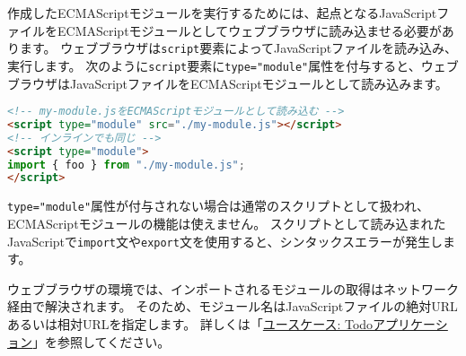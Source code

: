 作成したECMAScriptモジュールを実行するためには、起点となるJavaScriptファイルをECMAScriptモジュールとしてウェブブラウザに読み込ませる必要があります。
ウェブブラウザは\texttt{script}要素によってJavaScriptファイルを読み込み、実行します。
次のように\texttt{script}要素に\texttt{type="module"}属性を付与すると、ウェブブラウザはJavaScriptファイルをECMAScriptモジュールとして読み込みます。

\begin{lstlisting}[language=HTML]
<!-- my-module.jsをECMAScriptモジュールとして読み込む -->
<script type="module" src="./my-module.js"></script>
<!-- インラインでも同じ -->
<script type="module">
import { foo } from "./my-module.js";
</script>
\end{lstlisting}

\texttt{type="module"}属性が付与されない場合は通常のスクリプトとして扱われ、ECMAScriptモジュールの機能は使えません。
スクリプトとして読み込まれたJavaScriptで\texttt{import}文や\texttt{export}文を使用すると、シンタックスエラーが発生します。

ウェブブラウザの環境では、インポートされるモジュールの取得はネットワーク経由で解決されます。
そのため、モジュール名はJavaScriptファイルの絶対URLあるいは相対URLを指定します。
詳しくは「\hyperlink{todo-app}{ユースケース: Todoアプリケーション}」を参照してください。
